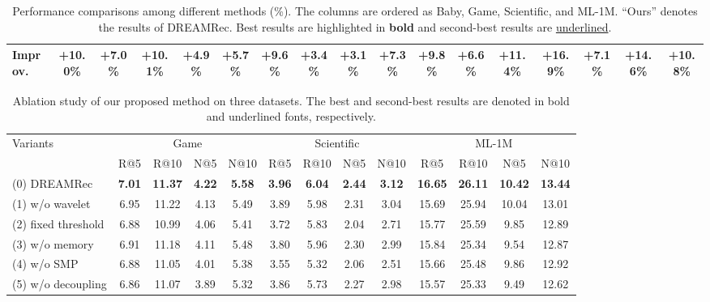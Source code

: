 \documentclass[letterpaper]{article} %
\theoremstyle{definition} %
\begin{document}
\begin{table}[t]
\begin{tabular}{@{} l cccc cccc cccc cccc @{}}
    Improv.  & +10.0\% & +7.0\% & +10.1\% & +4.9\% & +5.7\% & +9.6\% & +3.4\% & +3.1\% & +7.3\% & +9.8\% & +6.6\% & +11.4\% & +16.9\% & +7.1\% & +14.6\% & +10.8\% \\
    \bottomrule
  \end{tabular}
  \caption{Performance comparisons among different methods (\%). The columns are ordered as Baby, Game, Scientific, and ML-1M. ``Ours'' denotes the results of DREAMRec. Best results are highlighted in \textbf{bold} and second-best results are \underline{underlined}.}
  \label{tab:performance_reordered}
\end{table}

\begin{table}[t]
  \centering
  \small
  \renewcommand{\arraystretch}{1.2}
  \begin{tabular*}{\linewidth}{@{\extracolsep{\fill}} l cccc cccc cccc}
    \toprule
    \multirow{2}{*}{Variants} &
    \multicolumn{4}{c}{Game} &
    \multicolumn{4}{c}{Scientific} &
    \multicolumn{4}{c}{ML-1M} \\
    \cmidrule(lr){2-5} \cmidrule(lr){6-9} \cmidrule(lr){10-13}
    & R@5 & R@10 & N@5 & N@10 & R@5 & R@10 & N@5 & N@10 & R@5 & R@10 & N@5 & N@10 \\
    \midrule
    (0) DREAMRec &
    \textbf{7.01} & \textbf{11.37} & \textbf{4.22} & \textbf{5.58} &
    \textbf{3.96} & \textbf{6.04} & 
    \textbf{2.44} & \textbf{3.12} &
    \textbf{16.65} & \textbf{26.11} & \textbf{10.42} & \textbf{13.44} \\
    (1) w/o wavelet &
    6.95 & 11.22 & 4.13 & 5.49 &
    3.89 & 5.98 & 2.31 & 3.04 &
    15.69 & 25.94 & 10.04 & 13.01 \\
    (2) fixed threshold &
    6.88 & 10.99 & 4.06 & 5.41 &
    3.72 & 5.83 & 2.04 & 2.71 &
    15.77 & 25.59 & 9.85 & 12.89 \\
    (3) w/o memory &
    6.91 & 11.18 & 4.11 & 5.48 &
    3.80 & 5.96 & 2.30 & 2.99 &
    15.84 & 25.34 & 9.54 & 12.87 \\
    (4) w/o SMP &
    6.88 & 11.05 & 4.01 & 5.38 &
    3.55 & 5.32 & 2.06 & 2.51 &
    15.66 & 25.48 & 9.86 & 12.92 \\
    (5) w/o decoupling &
    6.86 & 11.07 & 3.89 & 5.32 &
    3.86 & 5.73 & 2.27 & 2.98 &
    15.57 & 25.33 & 9.49 & 12.62 \\

    
    \bottomrule
  \end{tabular*}
  \caption{Ablation study of our proposed method on three datasets. The best and second-best results are denoted in bold and underlined fonts, respectively.}
  \label{tab:ablation_study}
\end{table}
\end{document}
